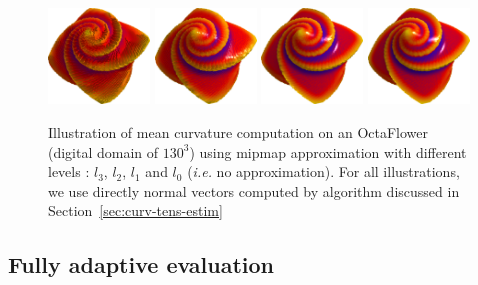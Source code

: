 \documentclass{llncs}
\newcommand{\ie}{\emph{i.e.} }
\begin{document}
\begin{figure}[!htbp]
  \begin{center}
   {\includegraphics[width=2.7cm]{figs/octa_r10_l3_a}}
   {\includegraphics[width=2.7cm]{figs/octa_r10_l2_a}}
   {\includegraphics[width=2.7cm]{figs/octa_r10_l1_a}}
   {\includegraphics[width=2.7cm]{figs/octa_r10_l0_a}}
  \end{center}
  \caption{Illustration of mean curvature computation on an OctaFlower (digital domain of $130^3$) using mipmap approximation with different levels : $l_3$, $l_2$, $l_1$ and $l_0$ (\ie no approximation).
  For all illustrations, we use directly normal vectors computed by algorithm discussed in Section~\ref{sec:curv-tens-estim}}
  \label{fig:refine}
\end{figure}


\subsection{Fully adaptive evaluation}
\end{document}
